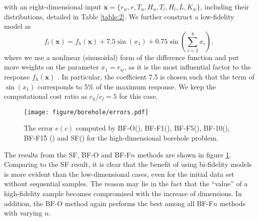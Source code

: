 \documentclass[11pt]{article}
\begin{document}
with an eight-dimensional input $\mathbf{x} = \{r_w, r, T_u, H_u, T_l, H_l, L, K_w\}$, including their distributions, detailed in Table \ref{table:2}. We further construct a low-fidelity model as 
\begin{equation}
    f_l(\mathbf{x}) = f_h(\mathbf{x}) + 7.5 \sin(x_1) + 0.75 \sin(\sum_{i=2}^8 x_i),
\label{borehole_l}
\end{equation}
where we use a nonlinear (sinusoidal) form of the difference function and put more weights on the parameter $x_1=r_w$, as it is the most influential factor to the response $f_h(\mathbf{x})$ \cite{harper1983sensitivity}. In particular, the coefficient 7.5 is chosen such that the term of $\sin(x_1)$ corresponds to 5\% of the maximum response. We keep the computational cost ratio as $c_h/c_l=5$ for this case.




\begin{figure}
    \centering
    \texttt{[image: figure/borehole/errors.pdf]}
    \caption{The error $e(c)$ computed by BF-O(\blackline), BF-F1(\orangedashedline), BF-F5(\reddashedline), BF-10(\purpledashedline), BF-F15 (\browndashedline) and SF(\blueline) for the high-dimensional borehole problem.}
    \label{fig:borehole}
\end{figure}


The results from the SF, BF-O and BF-F$n$ methods are shown in figure \ref{fig:borehole}.  Comparing to the SF result, it is clear that the benefit of using bi-fidelity models is more evident than the low-dimensional cases, even for the initial data set without sequential samples. The reason may lie in the fact that the ``value'' of a high-fidelity sample becomes compromised with the increase of dimensions. In addition, the BF-O method again performs the best among all BF-F$n$ methods with varying $n$.  
\end{document}
